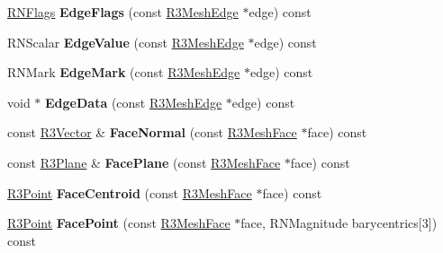 \begin{DoxyCompactItemize}
\item 
\hyperlink{class_r_n_flags}{R\+N\+Flags} {\bfseries Edge\+Flags} (const \hyperlink{class_r3_mesh_edge}{R3\+Mesh\+Edge} $\ast$edge) const \hypertarget{class_r3_mesh_a17bb0f96b8b4195bd9e0f6b7bddaad25}{}\label{class_r3_mesh_a17bb0f96b8b4195bd9e0f6b7bddaad25}

\item 
R\+N\+Scalar {\bfseries Edge\+Value} (const \hyperlink{class_r3_mesh_edge}{R3\+Mesh\+Edge} $\ast$edge) const \hypertarget{class_r3_mesh_ac2b6995c6395974fef02af4dec347873}{}\label{class_r3_mesh_ac2b6995c6395974fef02af4dec347873}

\item 
R\+N\+Mark {\bfseries Edge\+Mark} (const \hyperlink{class_r3_mesh_edge}{R3\+Mesh\+Edge} $\ast$edge) const \hypertarget{class_r3_mesh_a5b5a56eec7cc2bdad297e1d03bfd5e7e}{}\label{class_r3_mesh_a5b5a56eec7cc2bdad297e1d03bfd5e7e}

\item 
void $\ast$ {\bfseries Edge\+Data} (const \hyperlink{class_r3_mesh_edge}{R3\+Mesh\+Edge} $\ast$edge) const \hypertarget{class_r3_mesh_a6bc882e05122386cd93323372608efbd}{}\label{class_r3_mesh_a6bc882e05122386cd93323372608efbd}

\item 
const \hyperlink{class_r3_vector}{R3\+Vector} \& {\bfseries Face\+Normal} (const \hyperlink{class_r3_mesh_face}{R3\+Mesh\+Face} $\ast$face) const \hypertarget{class_r3_mesh_a5b7302972ac74ceebbd028989bbd13a2}{}\label{class_r3_mesh_a5b7302972ac74ceebbd028989bbd13a2}

\item 
const \hyperlink{class_r3_plane}{R3\+Plane} \& {\bfseries Face\+Plane} (const \hyperlink{class_r3_mesh_face}{R3\+Mesh\+Face} $\ast$face) const \hypertarget{class_r3_mesh_ac88c83f229b6db00fe71a16832e029ff}{}\label{class_r3_mesh_ac88c83f229b6db00fe71a16832e029ff}

\item 
\hyperlink{class_r3_point}{R3\+Point} {\bfseries Face\+Centroid} (const \hyperlink{class_r3_mesh_face}{R3\+Mesh\+Face} $\ast$face) const \hypertarget{class_r3_mesh_ae10d78367adb416b01974704da391fef}{}\label{class_r3_mesh_ae10d78367adb416b01974704da391fef}

\item 
\hyperlink{class_r3_point}{R3\+Point} {\bfseries Face\+Point} (const \hyperlink{class_r3_mesh_face}{R3\+Mesh\+Face} $\ast$face, R\+N\+Magnitude barycentrics\mbox{[}3\mbox{]}) const \hypertarget{class_r3_mesh_a7fafb76a7ec0671896a137dcbcd32191}{}\label{class_r3_mesh_a7fafb76a7ec0671896a137dcbcd32191}


\end{DoxyCompactItemize}
